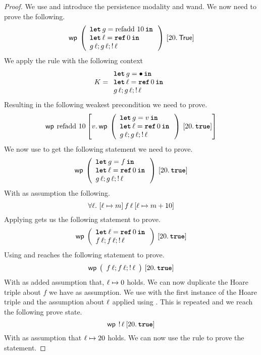 \documentclass[thesis.tex]{subfiles}
\begin{document}
\begin{proof}
  We use  and introduce the persistence modality and wand. We now need to prove the following.
  \[\wpre{
      \left(
      \begin{array}{l}
        \Let g = \operatorname{refadd}\, 10 in \\
        \Let \loc = \Alloc 0 in                \\
        g\, \loc; g\, \loc; \deref \loc
      \end{array}
      \right)
    }{\Ret 20. \TRUE}\]
  We apply the  rule with the following context
  \[
    \lctx = \begin{array}{l}
      \Let g = \bullet in     \\
      \Let \loc = \Alloc 0 in \\
      g\, \loc; g\, \loc; \deref \loc
    \end{array}
  \]
  Resulting in the following weakest precondition we need to prove.
  \[
    \wpre{\operatorname{refadd}\, 10}{
      \Ret\val. \wpre{\left(\begin{array}{l}
          \Let g = \val in        \\
          \Let \loc = \Alloc 0 in \\
          g\, \loc; g\, \loc; \deref \loc
        \end{array}\right)}{\Ret 20. \True}
    }
  \]
  We now use  to get the following statement we need to prove.
  \[
    \wpre{\left(\begin{array}{l}
        \Let g = f in           \\
        \Let \loc = \Alloc 0 in \\
        g\, \loc; g\, \loc; \deref \loc
      \end{array}\right)}{\Ret 20. \True}
  \]
  With as assumption the following.
  \[
    \forall \loc.\ \hoare{\loc \fmapsto m}{f\, \loc}{\loc\fmapsto m + 10}
  \]
  Applying  gets us the following statement to prove.
  \[
    \wpre{\left(\begin{array}{l}
        \Let \loc = \Alloc 0 in \\
        f\, \loc; f\, \loc; \deref \loc
      \end{array}\right)}{\Ret 20. \True}
  \]
  Using  and  reaches the following statement to prove.
  \[
    \wpre{\left(\begin{array}{l}
        f\, \loc; f\, \loc; \deref \loc
      \end{array}\right)}{\Ret 20. \True}
  \]
  With as added assumption that, $\loc \fmapsto 0$ holds. We can now duplicate the Hoare triple about $f$ we have as assumption. We use  with the first instance of the Hoare triple and the assumption about $\ell$ applied using . This is repeated and we reach the following prove state.
  \[
    \wpre{\deref \loc}{\Ret 20. \True}
  \]
  With as assumption that $\loc \fmapsto 20$ holds. We can now use the  rule to prove the statement.

\end{proof}
\end{document}
